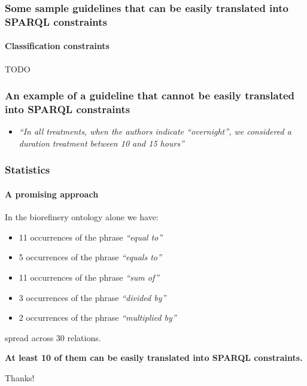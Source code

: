 \documentclass{beamer}
\begin{document}
\begin{frame}
  \frametitle{Some sample guidelines that can be easily translated into SPARQL constraints}
  \framesubtitle{Classification constraints}

  TODO
\end{frame}

\begin{frame}
  \frametitle{An example of a guideline that \textbf{cannot} be easily translated into SPARQL constraints}

  \begin{itemize}
    \item \textit{``In all treatments, when the authors indicate ``overnight'', we considered a duration treatment between 10 and 15 hours''}
  \end{itemize}
\end{frame}

\begin{frame}
  \frametitle{Statistics}
  \framesubtitle{A promising approach}

  In the biorefinery ontology alone we have:

  \begin{itemize}
    \item 11 occurrences of the phrase \textit{``equal to''}
    \item 5 occurrences of the phrase \textit{``equals to''}
    \item 11 occurrences of the phrase \textit{``sum of''}
    \item 3 occurrences of the phrase \textit{``divided by''}
    \item 2 occurrences of the phrase \textit{``multiplied by''}
  \end{itemize}

  spread across 30 relations.

  \vspace{1em}

  \textbf{At least 10 of them can be easily translated into SPARQL constraints.}
\end{frame}

\begin{frame}
  \begin{center}
    \Huge{Thanks!}
  \end{center}
\end{frame}
\end{document}
